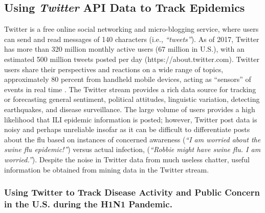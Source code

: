 \documentclass[sigconf]{acmart}
\begin{document}
\subsection{Using {\itshape Twitter} API Data to Track Epidemics}

Twitter is a free online social networking and micro-blogging service, where users can send 
and read messages of 140 characters (i.e., {\it ``tweets''}). As of 2017, Twitter has more 
than 320 million monthly active users (67 million in U.S.), with an estimated 500 million 
tweets posted per day (https://about.twitter.com). Twitter users share their perspectives and
reactions on a wide range of topics, approximately 80 percent from handheld mobile devices, 
acting as ``sensors'' of events in real time \cite{achrekar12}. The Twitter stream provides 
a rich data source for tracking or forecasting general sentiment, political attitudes, 
linguistic variation, detecting earthquakes, and disease surveillance. The large volume of 
users provides a high likelihood that ILI epidemic information is posted; however, Twitter 
post data is noisy and perhaps unreliable insofar as it can be difficult to differentiate 
posts about the flu based on instances of concerned awareness ({\it ``I am worried about 
the swine flu epidemic!''}) versus actual infection, ({\it ``Robbie might have swine flu. 
I am worried.''})\cite{lamb13}. Despite the noise in Twitter data from much useless chatter, 
useful information be obtained from mining data in the Twitter stream. 


\subsubsection{Using Twitter to Track Disease Activity and Public Concern in the 
U.S. during the H1N1 Pandemic.}
\end{document}
